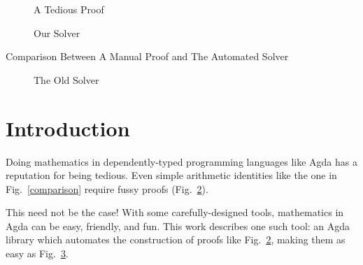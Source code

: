 \documentclass[acmsmall,review,anonymous]{acmart}\settopmatter{printfolios=true,printccs=false,printacmref=false}
\theoremstyle{remark}
\begin{document}
\begin{teaserfigure}
  \centering
  \begin{subfigure}[b]{\textwidth}
    \centering
    \label{ring-lemma}
  \end{subfigure}
  \begin{subfigure}[b]{.5\textwidth}
    \caption{A Tedious Proof}
    \label{ring-proof}
  \end{subfigure}%
  \begin{subfigure}[b]{.3\textwidth}
    \centering
    \caption{Our Solver}
    \label{the-solver}
  \end{subfigure}
  \caption{Comparison Between A Manual Proof and The Automated Solver}
  \label{comparison}
\end{teaserfigure}

\maketitle

\begin{figure}
  \caption{The Old Solver}
  \label{old-solver}
\end{figure}
\section{Introduction}
Doing mathematics in dependently-typed programming languages like Agda has a
reputation for being tedious. Even simple arithmetic identities like the one in
Fig.~\ref{comparison} require fussy proofs (Fig.~\ref{ring-proof}).

This need not be the case! With some carefully-designed tools, mathematics in
Agda can be easy, friendly, and fun. This work describes one such tool: an
Agda library which automates the construction of proofs like
Fig.~\ref{ring-proof}, making them as easy as Fig.~\ref{the-solver}.
\end{document}
